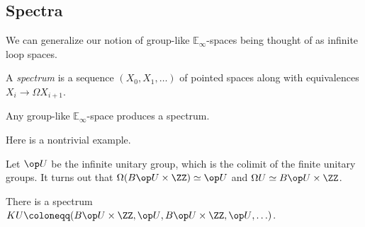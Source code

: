 \documentclass[../notes.tex]{subfiles}
\begin{document}
\subsection{Spectra}
We can generalize our notion of group-like $\mathbb E_\infty$-spaces being thought of as infinite loop spaces.
\begin{definition}[spectrum]
	A \textit{spectrum} is a sequence $(X_0,X_1,\ldots)$ of pointed spaces along with equivalences $X_i\to\Omega X_{i+1}$.
\end{definition}
\begin{example}
	Any group-like $\mathbb E_\infty$-space produces a spectrum.
\end{example}
Here is a nontrivial example.
\begin{theorem} \label{thm:bott-periodicity}
	Let $\op U$ be the infinite unitary group, which is the colimit of the finite unitary groups. It turns out that $\Omega(B{\op U}\times\ZZ)\simeq\op U$ and $\Omega U\simeq B\op U\times\ZZ$.
\end{theorem}
\begin{example}
	There is a spectrum $KU\coloneqq(B{\op U}\times\ZZ,{\op U},B{\op U}\times\ZZ,{\op U},\ldots)$.
\end{example}
\end{document}
